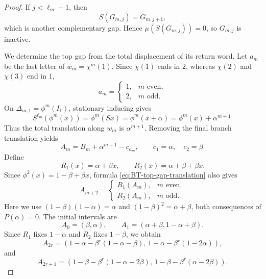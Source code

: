 \documentclass[11pt]{amsart}
\theoremstyle{plain}
\theoremstyle{definition}
\theoremstyle{remark}
\begin{document}
\begin{proof}
If \(j<\ell_m-1\), then
\[
        S(G_{m,j})=G_{m,j+1},
\]
which is another complementary gap. Hence \(\mu(S(G_{m,j}))=0\), so
\(G_{m,j}\) is inactive.

We determine the top gap from the total displacement of its return word. Let \(a_m\) be the
last letter of \(w_m=\chi^m(1)\). Since \(\chi(1)\) ends in \(2\), whereas
\(\chi(2)\) and \(\chi(3)\) end in \(1\),
\[
        a_m=
        \begin{cases}
        1,&m\text{ even},\\
        2,&m\text{ odd}.
        \end{cases}
\tag{8.22}
\label{eq:BT-last-letter}
\]
On \(\Delta_{m,1}=\phi^m(I_1)\), stationary inducing gives
\[
        S^{\ell_m}(\phi^m(x))
        =\phi^m(Sx)
        =\phi^m(x+\alpha)
        =\phi^m(x)+\alpha^{m+1}.
\]
Thus the total translation along \(w_m\) is \(\alpha^{m+1}\). Removing the final branch
translation yields
\[
        A_m
        =B_m+\alpha^{m+1}-c_{a_m},
        \qquad
        c_1=\alpha,
        \quad
        c_2=\beta.
\tag{8.23}
\label{eq:BT-top-gap-translation}
\]
Define
\[
        R_1(x)=\alpha+\beta x,
        \qquad
        R_2(x)=\alpha+\beta+\beta x.
\tag{8.24}
\label{eq:BT-R-maps}
\]
Since \(\phi^2(x)=1-\beta+\beta x\), formula
\eqref{eq:BT-top-gap-translation} also gives
\[
        A_{m+2}=
        \begin{cases}
        R_1(A_m),&m\text{ even},\\
        R_2(A_m),&m\text{ odd}.
        \end{cases}
\tag{8.25}
\label{eq:BT-active-recursion}
\]
Here we use
\((1-\beta)(1-\alpha)=\alpha\) and \((1-\beta)^2=\alpha+\beta\), both consequences
of \(P(\alpha)=0\). The initial intervals are
\[
        A_0=(\beta,\alpha),
        \qquad
        A_1=(\alpha+\beta,1-\alpha+\beta).
\tag{8.26}
\label{eq:BT-active-initial}
\]
Since \(R_1\) fixes \(1-\alpha\) and \(R_2\) fixes \(1-\beta\), we obtain
\[
A_{2r}
=
\left(
1-\alpha-\beta^r(1-\alpha-\beta),
\,
1-\alpha-\beta^r(1-2\alpha)
\right),
\tag{8.27}
\label{eq:BT-active-even}
\]
and
\[
A_{2r+1}
=
\left(
1-\beta-\beta^r(1-\alpha-2\beta),
\,
1-\beta-\beta^r(\alpha-2\beta)
\right).
\tag{8.28}
\label{eq:BT-active-odd}
\]


\end{proof}
\end{document}
